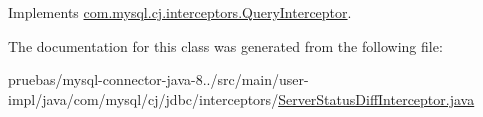 Implements \mbox{\hyperlink{interfacecom_1_1mysql_1_1cj_1_1interceptors_1_1_query_interceptor_a1613f5491fdb4610d5727d60c904e7e2}{com.\+mysql.\+cj.\+interceptors.\+Query\+Interceptor}}.



The documentation for this class was generated from the following file\+:\begin{DoxyCompactItemize}
\item 
pruebas/mysql-\/connector-\/java-\/8../src/main/user-\/impl/java/com/mysql/cj/jdbc/interceptors/\mbox{\hyperlink{_server_status_diff_interceptor_8java}{Server\+Status\+Diff\+Interceptor.\+java}}\end{DoxyCompactItemize}
